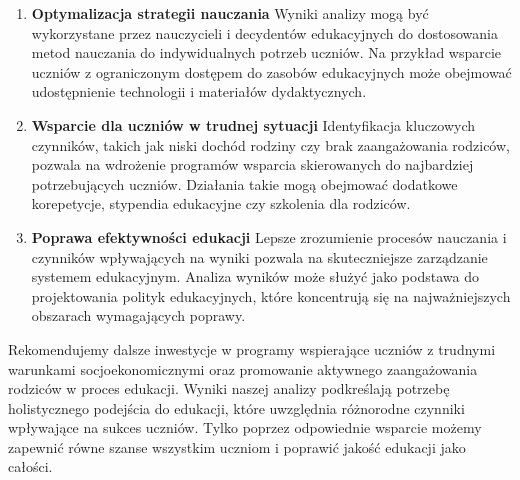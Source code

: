\documentclass[
]{article}
\begin{document}
\begin{enumerate}
\def\labelenumi{\arabic{enumi}.}
\item
  \textbf{Optymalizacja strategii nauczania} Wyniki analizy mogą być
  wykorzystane przez nauczycieli i decydentów edukacyjnych do
  dostosowania metod nauczania do indywidualnych potrzeb uczniów. Na
  przykład wsparcie uczniów z ograniczonym dostępem do zasobów
  edukacyjnych może obejmować udostępnienie technologii i materiałów
  dydaktycznych.
\item
  \textbf{Wsparcie dla uczniów w trudnej sytuacji} Identyfikacja
  kluczowych czynników, takich jak niski dochód rodziny czy brak
  zaangażowania rodziców, pozwala na wdrożenie programów wsparcia
  skierowanych do najbardziej potrzebujących uczniów. Działania takie
  mogą obejmować dodatkowe korepetycje, stypendia edukacyjne czy
  szkolenia dla rodziców.
\item
  \textbf{Poprawa efektywności edukacji} Lepsze zrozumienie procesów
  nauczania i czynników wpływających na wyniki pozwala na skuteczniejsze
  zarządzanie systemem edukacyjnym. Analiza wyników może służyć jako
  podstawa do projektowania polityk edukacyjnych, które koncentrują się
  na najważniejszych obszarach wymagających poprawy.
\end{enumerate}

Rekomendujemy dalsze inwestycje w programy wspierające uczniów z
trudnymi warunkami socjoekonomicznymi oraz promowanie aktywnego
zaangażowania rodziców w proces edukacji. Wyniki naszej analizy
podkreślają potrzebę holistycznego podejścia do edukacji, które
uwzględnia różnorodne czynniki wpływające na sukces uczniów. Tylko
poprzez odpowiednie wsparcie możemy zapewnić równe szanse wszystkim
uczniom i poprawić jakość edukacji jako całości.
\end{document}

